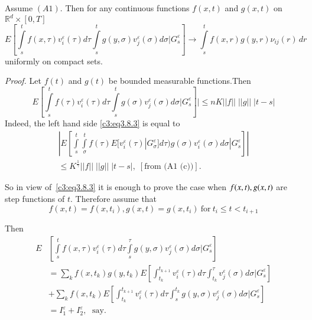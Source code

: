 \begin{Lemma}\label{c3:lem3.8.1} %
  Assume $(A1)$. Then for any continuous functions $f(x,t)$ and $g (x,
  t )$ on $\mathbb{R}^d \times [0,T]$ 
  \begin{equation*}
    E \left[\int\limits_s^t f(x,\tau) v^\varepsilon_i (\tau) d\tau
      \int\limits_s^t g (y,\sigma) v^{\varepsilon}_j (\sigma) d
      \sigma|G^\varepsilon_s \right]\to 
    \int\limits^t_s f(x,r) g (y,r) \nu_{ij}(r) \, dr 
\tag{3.8.2}\label{c3:eq3.8.2} 
\end{equation*}\pageoriginale
  uniformly on compact sets.
\end{Lemma}

\noindent 
\textit{Proof.}
  Let $f(t)$ and $g(t)$ be bounded measurable functions.Then
  \begin{equation*}
    E \left[\int\limits_s^t f(\tau) v^\varepsilon_i (\tau) d\tau
      \int\limits_s^t g (\sigma)  v^\varepsilon_j (\sigma)d \sigma
      |G^\varepsilon_s\right] |\le nK ||f|| 
\; ||g|| \;  |t-s| \tag{3.8.3}\label{c3:eq3.8.3} 
  \end{equation*}
  Indeed, the left hand side \eqref{c3:eq3.8.3} is equal to 
  \begin{multline*}
  \left| E \left[\int\limits_s^t \int\limits^t_\sigma f(\tau) E [v^\varepsilon_i (\tau)
      |G^\varepsilon_\sigma] d \tau) g (\sigma) v^\varepsilon_i (\sigma)
    d \sigma | G^\varepsilon_s\right]\right|\\ 
  \le K^{\frac{1}{\gamma}} ||f|| \; ||g|| \; |t-s|, \; [\text{from (A1
      (c))}].\tag*{$\Box$}   
  \end{multline*}

So in view of~\eqref{c3:eq3.8.3} it is enough to prove the case when $f (x,t),\break g
(x,t)$ are step functions of $t$. Therefore assume that 
$$
f (x,t) = f(x, t_i), g(x,t) = g (x,t_i) ~\text{for}~ t_i \le t < t _{i+1}
$$

Then
\begin{align*}
  E & \left[\int\limits^t_s f(x,\tau) v^\varepsilon_i (\tau) d \tau
    \int\limits^\tau_s g (y,\sigma) v^\varepsilon_j (\sigma) d \sigma|
    G^\varepsilon_s\right]\\ 
  & = \sum_k f(x,t_k) g (y,t_k) E \left[\int^{t_{k +1}}_{t_{k}}
    v^\varepsilon_i (\tau) d \tau \int^\tau_{t_k} v^\varepsilon_j
    (\sigma) d \sigma | G^\varepsilon_s\right]\\ 
  & + \sum_k f(x,t_k) E \left[\int^{t_{k+1}}_{t_k}
    v^\varepsilon_i (\tau) d \tau \int^{t_k}_s  g (y, \sigma)
    v^\varepsilon_j (\sigma) d \sigma | G^\varepsilon_s\right]\\ 
  & = I^\varepsilon_1 + I^\varepsilon_2, \; \text{ say}.
\end{align*}

